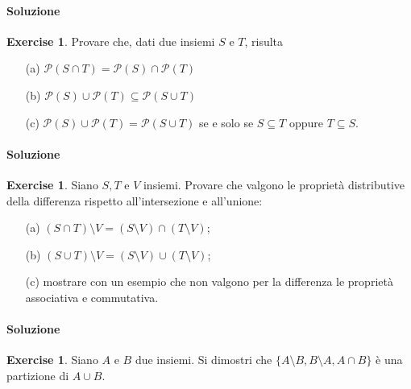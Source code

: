 \documentclass{article}
\theoremstyle{plain}
\theoremstyle{definition}
\newtheorem{xca}[exmp]{Exercise}
\theoremstyle{remark}
\begin{document}
\paragraph{Soluzione}

\begin{bxthm}
\begin{xca}
Provare che, dati due insiemi $S$ e $T$, risulta
\begin{itemize}
    \item[(a)] $\mathcal{P}(S \cap T) = \mathcal{P}(S) \cap \mathcal{P}(T)$
    \item[(b)] $\mathcal{P}(S) \cup \mathcal{P}(T) \subseteq \mathcal{P}(S \cup T)$
    \item[(c)] $\mathcal{P}(S) \cup \mathcal{P}(T) = \mathcal{P}(S \cup T)$ se e solo se $S \subseteq T$ oppure $T \subseteq S$.
\end{itemize}
\end{xca}
\end{bxthm}
\paragraph{Soluzione}

\begin{bxthm}
\begin{xca}
Siano $S, T$ e $V$ insiemi. Provare che valgono le proprietà distributive 
della differenza rispetto all'intersezione e all'unione:
\begin{itemize}
    \item[(a)] $(S \cap T) \setminus V = (S \setminus V) \cap (T \setminus V)$;
    \item[(b)] $(S \cup T) \setminus V = (S \setminus V) \cup (T \setminus V)$;
    \item[(c)] mostrare con un esempio che non valgono per la differenza le proprietà associativa e commutativa.
\end{itemize}
\end{xca}
\end{bxthm}
\paragraph{Soluzione}

\begin{bxthm}
\begin{xca}
Siano $A$ e $B$ due insiemi. Si dimostri che 
$\{A \setminus B, B \setminus A, A \cap B\}$ è una partizione di $A \cup B$.
\end{xca}
\end{bxthm}
\end{document}
